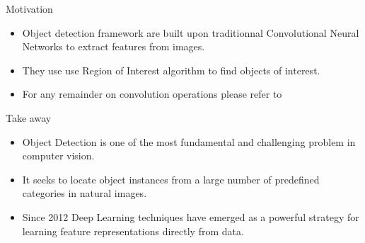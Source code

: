 \documentclass{beamer}
\begin{document}
\begin{frame}{Motivation}
    \begin{itemize}
    	\item Object detection framework are built upon traditionnal Convolutional Neural Networks to extract features from images.
	    \item They use use Region of Interest algorithm to find objects of interest.
	    \item For any remainder on convolution operations please refer to \cite{dumoulin_guide_2018}
    \end{itemize}
\end{frame}

\begin{frame}{Take away}
    \begin{itemize}
        \item Object Detection is one of the most fundamental and challenging problem in computer vision.
        \item It seeks to locate object instances from a large number of predefined categories in natural images.
        \item Since 2012 Deep Learning techniques have emerged as a powerful strategy for learning feature representations directly from data.
    \end{itemize}
\end{frame}
\end{document}
